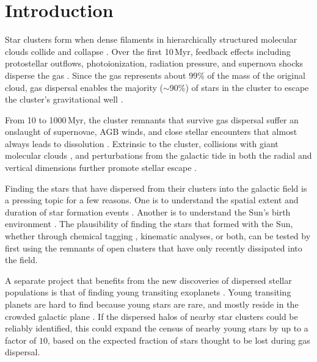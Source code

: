 \documentclass[12pt,twocolumn,tighten]{aastex63}
\begin{document}
\section{Introduction}

Star clusters form when dense filaments in hierarchically structured
molecular clouds collide and collapse \citep{shu_star_1987}.  Over the
first 10\,Myr, feedback effects including protostellar outflows,
photoionization, radiation pressure, and supernova shocks disperse the
gas \citep{krumholz_star_2019}.  Since the gas represents about 99\%
of the mass of the original cloud, gas dispersal enables the majority
($\sim$90\%) of stars in the cluster to escape the cluster's
gravitational well \citep{lada_embedded_2003}.

From 10 to 1000\,Myr, the cluster remnants that survive gas dispersal
suffer an onslaught of supernovae, AGB winds, and close stellar
encounters that almost always leads to dissolution
\citep{lamers_mass_loss_2010}.  Extrinsic to the cluster, collisions
with giant molecular clouds \citep{spitzer_disruption_1958}, and
perturbations from the galactic tide in both the radial and vertical
dimensions further promote stellar escape \citep[{\it
e.g.},][]{fukushige_timescale_2000,bergond_gravitational_2001}.

Finding the stars that have dispersed from their clusters into the
galactic field is a pressing topic for a few reasons.  One is to
understand the spatial extent and duration of star formation events
\citep[{\it e.g.},][]{wright_kinematics_2018}.  Another is to
understand the Sun's birth environment \citep{adams_birth_2010}.  The
plausibility of finding the stars that formed with the Sun, whether
through chemical tagging
\citep{freeman_new_2002,hogg_chemical_2016,ness_dopplergangers_2018},
kinematic analyses, or both, can be tested by first using the
remnants of open clusters that have only recently
dissipated into the field.

A separate project that benefits from the new discoveries of dispersed
stellar populations is that of finding young transiting exoplanets
\citep[{\it
e.g.},][]{Mann_K2_33b_2016,ciardi_k2-136_2018,david_four_2019,livingston_k2-264_2019,bouma_cluster_2020,rizzuto_tess_2020,plavchan_planet_2020,newton_2021,tofflemire_2021,zhou_2021_tois}.
Young transiting planets are hard to find because young stars are
rare, and mostly reside in the crowded galactic plane
\citep{Kharchenko_et_al_2013,piskunov_global_2018}.  If the dispersed
halos of nearby star clusters could be reliably identified, this could
expand the census of nearby young stars by up to a factor of $10$,
based on the expected fraction of stars thought to be lost during gas
dispersal.
\end{document}
